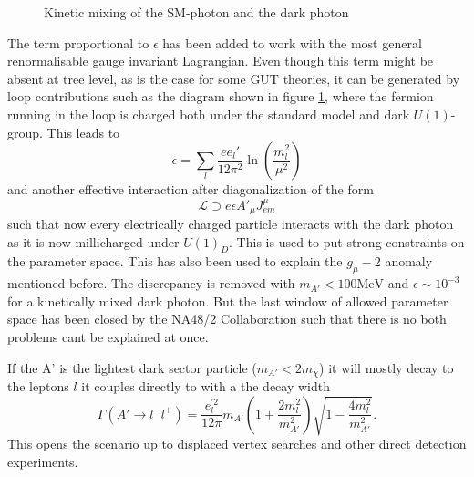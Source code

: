 \begin{figure}[H]
\centering
{}
\caption{Kinetic mixing of the SM-photon and the dark photon}
\label{fg:KinMix}
\end{figure}
The term proportional to $\epsilon$ has been added  to work with the most general renormalisable gauge invariant Lagrangian. 
Even though this term might be absent at tree level, as is the case for some GUT theories, it can be generated by loop contributions such as the diagram shown in figure \ref{fg:KinMix}, where the fermion running in the loop is charged both under the standard model and dark $U(1)$-group.
This leads to \cite{Rizzo:2018vlb}
\begin{equation}
\epsilon =\sum_l \frac{ee_l'}{12\pi^2}\ln\left(\frac{m_l^2}{\mu^2}\right)
\label{eq:KinMix}
\end{equation}
 and another effective interaction after diagonalization of the form 
\begin{equation}
\mathcal{L}\supset e\epsilon A'_\mu J_{em}^\mu
\end{equation}
such that now every electrically charged particle interacts with the dark photon as it is now millicharged under $U(1)_D$. This is used to put strong constraints on the parameter space.
This has also been used to explain the $g_\mu-2$ anomaly mentioned before. The discrepancy is removed with $m_{A'}<100\text{MeV}$ and $\epsilon\sim 10^{-3}$ for a kinetically mixed dark photon. But the last window of allowed parameter space has been closed by the NA48/2 Collaboration \cite{Goudzovski:2014rwa} such that there is no both problems cant be explained at once. 

If the A' is the lightest dark sector particle ($m_{A'}<2m_\chi$) it will mostly decay to the leptons $l$ it couples directly to with a the decay width
\begin{equation}
\Gamma(A' \rightarrow l^-l^+)=\frac{e_l^{'2}}{12\pi}m_{A'}\left(1+\frac{2m_l^2}{m_{A'}^2}\right)\sqrt{1-\frac{4m_l^2}{m_{A'}^2}}.
\end{equation}
This opens the scenario up to displaced vertex searches and other direct detection experiments. 

